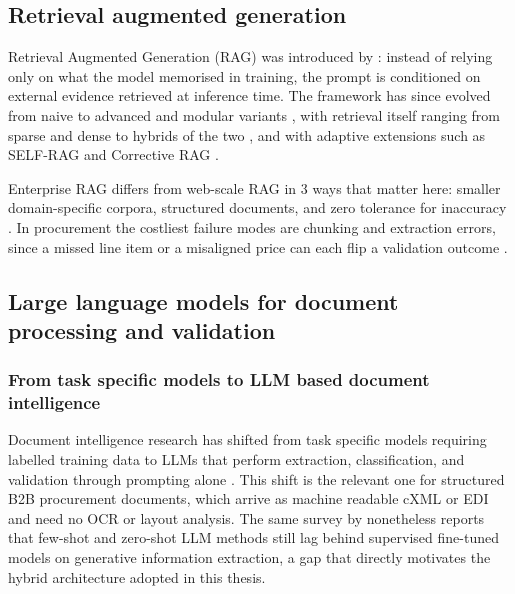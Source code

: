 \subsection{Retrieval augmented generation}
\label{sec:lr:rag}

Retrieval Augmented Generation (RAG) was introduced by \citet{lewis2020rag}: instead of relying only on what the model memorised in training, the prompt is conditioned on external evidence retrieved at inference time. The framework has since evolved from naive to advanced and modular variants \citep{gao2024rag, sharma2025}, with retrieval itself ranging from sparse \citep{robertson2009} and dense \citep{karpukhin2020} to hybrids of the two \citep{cormack2009}, and with adaptive extensions such as SELF-RAG \citep{asai2024} and Corrective RAG \citep{yan2024}.

Enterprise RAG differs from web-scale RAG in 3 ways that matter here: smaller domain-specific corpora, structured documents, and zero tolerance for inaccuracy \citep{karakurt2026}. In procurement the costliest failure modes are chunking and extraction errors, since a missed line item or a misaligned price can each flip a validation outcome \citep{barnett2024}.



\subsection{Large language models for document processing and validation}
\label{sec:lr:llm}

\subsubsection{From task specific models to LLM based document intelligence}

Document intelligence research has shifted from task specific models requiring labelled training data to LLMs that perform extraction, classification, and validation through prompting alone \citep{li2024gie,ke2025}. This shift is the relevant one for structured B2B procurement documents, which arrive as machine readable cXML or EDI and need no OCR or layout analysis. The same survey by \citet{li2024gie} nonetheless reports that few-shot and zero-shot LLM methods still lag behind supervised fine-tuned models on generative information extraction, a gap that directly motivates the hybrid architecture adopted in this thesis.

